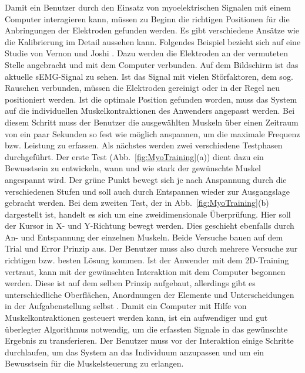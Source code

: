 %
%
Damit ein Benutzer durch den Einsatz von myoelektrischen Signalen mit einem Computer interagieren kann, müssen zu Beginn die richtigen Positionen für die Anbringungen der Elektroden gefunden werden. Es gibt verschiedene Ansätze wie die Kalibrierung im Detail aussehen kann. Folgendes Beispiel bezieht sich auf eine Studie von Vernon und Joshi \cite{MyoTraining}.
\newline
Dazu werden die Elektroden an der vermuteten Stelle angebracht und mit dem Computer verbunden. Auf dem Bildschirm ist das aktuelle sEMG-Signal zu sehen. Ist das Signal mit vielen Störfaktoren, dem sog. Rauschen verbunden, müssen die Elektroden gereinigt oder in der Regel neu positioniert werden. Ist die optimale Position gefunden worden, muss das System auf die individuellen Muskelkontraktionen des Anwenders angepasst werden. Bei diesem Schritt muss der Benutzer die ausgewählten Muskeln über einen Zeitraum von ein paar Sekunden so fest wie möglich anspannen, um die maximale Frequenz bzw. Leistung zu erfassen. Als nächstes werden zwei verschiedene Testphasen durchgeführt. Der erste Test (Abb.~\ref{fig:MyoTraining}(a)) dient dazu ein Bewusstsein zu entwickeln, wann und wie stark der gewünschte Muskel angespannt wird. Der grüne Punkt bewegt sich je nach Anspannung durch die verschiedenen Stufen und soll auch durch Entspannen wieder zur Ausgangslage gebracht werden. Bei dem zweiten Test, der in Abb.~\ref{fig:MyoTraining}(b) dargestellt ist, handelt es sich um eine zweidimensionale Überprüfung. Hier soll der Kursor in X- und Y-Richtung bewegt werden. Dies geschieht ebenfalls durch An- und Entspannung der einzelnen Muskeln. Beide Versuche bauen auf dem Trial und Error Prinzip aus. Der Benutzer muss also durch mehrere Versuche zur richtigen bzw. besten Lösung kommen. Ist der Anwender mit dem 2D-Training vertraut, kann mit der gewünschten Interaktion mit dem Computer begonnen werden. Diese ist auf dem selben Prinzip aufgebaut, allerdings gibt es unterschiedliche Oberflächen, Anordnungen der Elemente und Unterscheidungen in der Aufgabenstellung selbst \cite{MyoTraining}.
%
\newline \newline
Damit ein Computer mit Hilfe von Muskelkontraktionen gesteuert werden kann, ist ein aufwendiger und gut überlegter Algorithmus notwendig, um die erfassten Signale in das gewünschte Ergebnis zu transferieren. Der Benutzer muss vor der Interaktion einige Schritte durchlaufen, um das System an das Individuum anzupassen und um ein Bewusstsein für die Muskelsteuerung zu erlangen.

